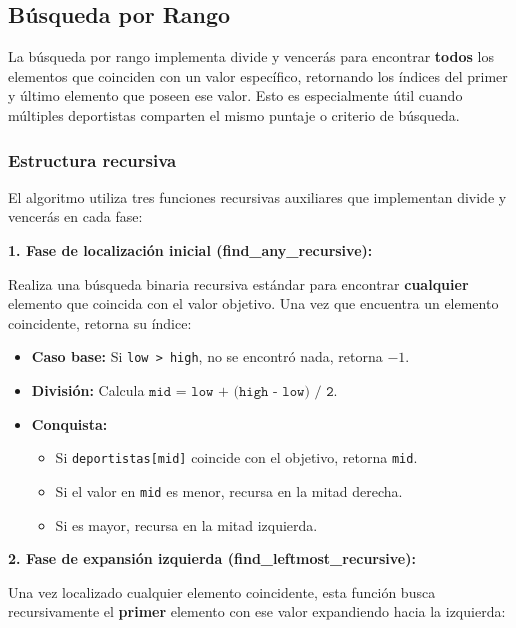 \subsection{Búsqueda por Rango}

La búsqueda por rango implementa divide y vencerás para encontrar \textbf{todos} los elementos que coinciden con un valor específico, retornando los índices del primer y último elemento que poseen ese valor. Esto es especialmente útil cuando múltiples deportistas comparten el mismo puntaje o criterio de búsqueda.

\subsubsection{Estructura recursiva}

El algoritmo utiliza tres funciones recursivas auxiliares que implementan divide y vencerás en cada fase:

\textbf{1. Fase de localización inicial (find\_any\_recursive):}

Realiza una búsqueda binaria recursiva estándar para encontrar \textbf{cualquier} elemento que coincida con el valor objetivo. Una vez que encuentra un elemento coincidente, retorna su índice:

\begin{itemize}
    \item \textbf{Caso base:} Si \texttt{low > high}, no se encontró nada, retorna $-1$.
    \item \textbf{División:} Calcula \(\texttt{mid = low + (high - low) / 2}\).
    \item \textbf{Conquista:} 
    \begin{itemize}
        \item Si \texttt{deportistas[mid]} coincide con el objetivo, retorna \texttt{mid}.
        \item Si el valor en \texttt{mid} es menor, recursa en la mitad derecha.
        \item Si es mayor, recursa en la mitad izquierda.
    \end{itemize}
\end{itemize}

\textbf{2. Fase de expansión izquierda (find\_leftmost\_recursive):}

Una vez localizado cualquier elemento coincidente, esta función busca recursivamente el \textbf{primer} elemento con ese valor expandiendo hacia la izquierda:

